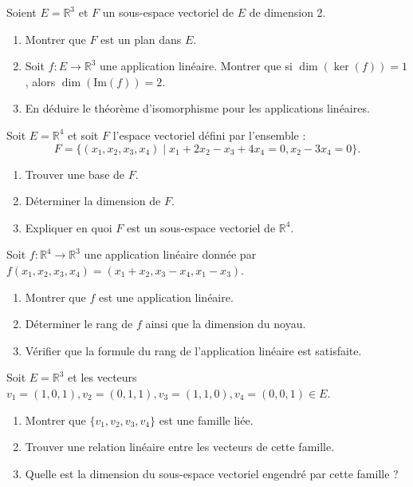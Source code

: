 \begin{exercice}
Soient \( E = \mathbb{R}^3 \) et \( F \) un sous-espace vectoriel de \( E \) de dimension 2.
\begin{enumerate}
    \item Montrer que \( F \) est un plan dans \( E \).
    \item Soit \( f : E \to \mathbb{R}^3 \) une application linéaire. Montrer que si \( \dim(\ker(f)) = 1 \), alors \( \dim(\text{Im}(f)) = 2 \).
    \item En déduire le théorème d’isomorphisme pour les applications linéaires.
\end{enumerate}
\end{exercice}

\begin{exercice}
Soit \( E = \mathbb{R}^4 \) et soit \( F \) l’espace vectoriel défini par l’ensemble :
\[
F = \{(x_1, x_2, x_3, x_4) \mid x_1 + 2x_2 - x_3 + 4x_4 = 0, x_2 - 3x_4 = 0\}.
\]
\begin{enumerate}
    \item Trouver une base de \( F \).
    \item Déterminer la dimension de \( F \).
    \item Expliquer en quoi \( F \) est un sous-espace vectoriel de \( \mathbb{R}^4 \).
\end{enumerate}
\end{exercice}

\begin{exercice}
Soit \( f : \mathbb{R}^4 \to \mathbb{R}^3 \) une application linéaire donnée par \( f(x_1, x_2, x_3, x_4) = (x_1 + x_2, x_3 - x_4, x_1 - x_3) \).
\begin{enumerate}
    \item Montrer que \( f \) est une application linéaire.
    \item Déterminer le rang de \( f \) ainsi que la dimension du noyau.
    \item Vérifier que la formule du rang de l’application linéaire est satisfaite.
\end{enumerate}
\end{exercice}

\begin{exercice}
Soit \( E = \mathbb{R}^3 \) et les vecteurs \( v_1 = (1, 0, 1), v_2 = (0, 1, 1), v_3 = (1, 1, 0), v_4 = (0, 0, 1) \in E \).
\begin{enumerate}
    \item Montrer que \( \{v_1, v_2, v_3, v_4\} \) est une famille liée.
    \item Trouver une relation linéaire entre les vecteurs de cette famille.
    \item Quelle est la dimension du sous-espace vectoriel engendré par cette famille ?
\end{enumerate}
\end{exercice}


